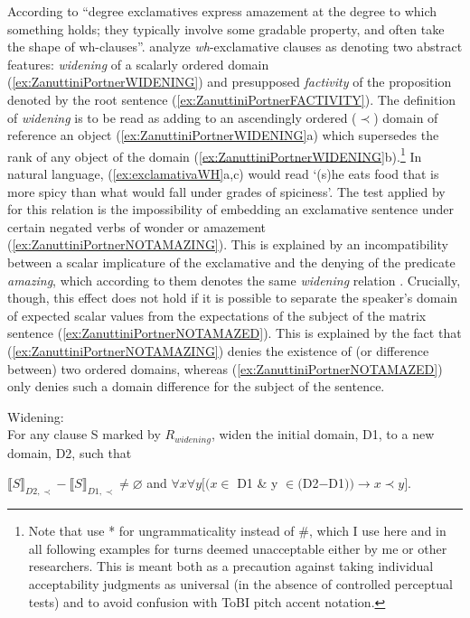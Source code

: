 According to \citet[26]{Grosz.2012} ``degree exclamatives express amazement at the degree to which something holds; they typically involve some gradable property, and often take the shape of wh-clauses''. \citet[15,16]{ZanuttiniPortner2003} analyze \textit{wh}-exclamative clauses as 
denoting two abstract features: \textit{widening} of a scalarly ordered 
domain (\ref{ex:ZanuttiniPortnerWIDENING}) 
and presupposed \textit{factivity} of the proposition denoted by the root 
sentence (\ref{ex:ZanuttiniPortnerFACTIVITY}). The definition of 
\textit{widening} is to be read as adding to an ascendingly 
ordered ($\prec$) domain of reference an object 
(\ref{ex:ZanuttiniPortnerWIDENING}a) which supersedes 
the rank of any object of the domain (\ref{ex:ZanuttiniPortnerWIDENING}b).\footnote{Note that \citet{ZanuttiniPortner2003} use * for ungrammaticality instead of \#, which I use here and in all following examples for turns deemed unacceptable either by me or other researchers. This is meant both as a precaution against taking individual acceptability judgments as universal (in the absence of controlled perceptual tests) and to avoid confusion with \ac{ToBI} pitch accent notation.} In natural language, (\ref{ex:exclamativaWH}a,c) would read `(s)he eats food that is more spicy than what would fall under grades of spiciness'.
The test applied by \citet{ZanuttiniPortner2003} for this relation is the impossibility of embedding an 
exclamative sentence under certain negated verbs of wonder or amazement 
(\ref{ex:ZanuttiniPortnerNOTAMAZING}). This is explained by an 
incompatibility between a scalar implicature of the exclamative and the 
denying of the predicate \textit{amazing}, which according to them denotes the 
same \textit{widening} relation \citep[21]{ZanuttiniPortner2003}. 
Crucially, though, this effect does not hold if it is possible to separate 
the speaker's domain of expected scalar values from the expectations of 
the subject of the matrix sentence (\ref{ex:ZanuttiniPortnerNOTAMAZED}). This is explained by the fact that 
(\ref{ex:ZanuttiniPortnerNOTAMAZING}) denies the existence of (or 
difference between) two ordered domains, whereas 
(\ref{ex:ZanuttiniPortnerNOTAMAZED}) only denies such a domain difference 
for the subject of the sentence.

\begin{exe}
	\judgewidth{\#}
	\ex \label{ex:ZanuttiniPortnerWIDENING}Widening:\\
	For any clause S marked by $R_{\textit{widening}}$, widen the 
	initial domain, D1, to a new domain, D2, such that
	\begin{xlist}
		\ex $ \llbracket S \rrbracket_{D2,\prec} - \llbracket S 
		\rrbracket_{D1,\prec} \neq \varnothing $ and 
		\ex $\forall x \forall y [(x\in $ D1 \& y $\in ($D2$-$D1$)) 
		\rightarrow x \prec y] $.
	\end{xlist}

\end{exe}

